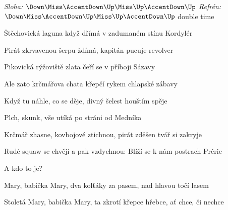 \begin{song}


\begin{headerbox}
\RaiseBoxWithAccents
\textit{Sloha:} $\Down\Miss\AccentDown\Up\Miss\Up\AccentDown\Up$
\textit{Refrén:} $\Down\Miss\AccentDown\Up\Miss\Up\AccentDown\Up$ double time
\end{headerbox}

\begin{hchordbox}
\end{hchordbox}

\large

\bigskip

Štěchovická laguna když dřímá v zadumaném stínu Kordylér \par
{}Pirát zkrvavenou šerpu ždímá, kapitán pucuje revolver \par
{}Pikovická rýžoviště zlata čeří se v příboji Sázavy \par
{}Ale zato krčmářova chata křepčí rykem chlapské zábavy \par

\bigskip

Když tu náhle, co se děje, divný šelest houštím spěje \par
{}Plch, skunk, vše utíká po stráni od Medníka \par

\bigskip

Krčmář zhasne, kovbojové ztichnou, pirát zděšen tvář si zakryje \par
{}Rudé squaw se chvějí a pak vzdychnou: Blíží se k nám postrach Prérie \par
A kdo to je? \par

\bigskip

Mary, babička Mary, dva kolťáky za pasem, nad hlavou točí lasem  \par
Stoletá Mary, babička Mary, ta zkrotí křepce hřebce, ať chce, či nechce  \par


\end{song}
